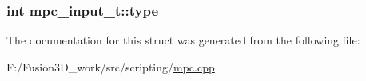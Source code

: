 \subsubsection[{type}]{\setlength{\rightskip}{0pt plus 5cm}int mpc\+\_\+input\+\_\+t\+::type}\label{structmpc__input__t_a9ca0473884ea61afc16435149a5eb623}


The documentation for this struct was generated from the following file\+:\begin{DoxyCompactItemize}
\item 
F\+:/\+Fusion3\+D\+\_\+work/src/scripting/\hyperlink{mpc_8cpp}{mpc.\+cpp}\end{DoxyCompactItemize}
